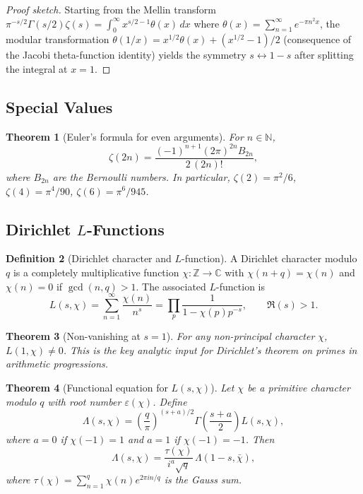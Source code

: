 \documentclass[12pt,a4paper]{amsart}
\newtheorem{theorem}{Theorem}[section]
\theoremstyle{definition}
\newtheorem{definition}[theorem]{Definition}
\begin{document}
\begin{proof}[Proof sketch]
Starting from the Mellin transform \(\pi^{-s/2}\Gamma(s/2)\zeta(s)
= \int_0^\infty x^{s/2-1}\theta(x)\,dx\) where
\(\theta(x) = \sum_{n=1}^\infty e^{-\pi n^2 x}\), the modular transformation
\(\theta(1/x) = x^{1/2}\theta(x) + (x^{1/2}-1)/2\) (consequence of the Jacobi
theta-function identity) yields the symmetry \(s \leftrightarrow 1-s\) after splitting
the integral at \(x = 1\).
\end{proof}

\subsection{Special Values}

\begin{theorem}[Euler's formula for even arguments]
For \(n \in \mathbb{N}\),
\[
  \zeta(2n) = \frac{(-1)^{n+1}(2\pi)^{2n}B_{2n}}{2\,(2n)!},
\]
where \(B_{2n}\) are the Bernoulli numbers.  In particular,
\(\zeta(2) = \pi^2/6\), \(\zeta(4) = \pi^4/90\), \(\zeta(6) = \pi^6/945\).
\end{theorem}

\subsection{Dirichlet \(L\)-Functions}

\begin{definition}[Dirichlet character and \(L\)-function]
A Dirichlet character modulo \(q\) is a completely multiplicative function
\(\chi: \mathbb{Z} \to \mathbb{C}\) with \(\chi(n+q) = \chi(n)\) and \(\chi(n) = 0\)
if \(\gcd(n,q) > 1\).  The associated \(L\)-function is
\[
  L(s,\chi) = \sum_{n=1}^\infty \frac{\chi(n)}{n^s}
  = \prod_p \frac{1}{1-\chi(p)p^{-s}}, \qquad \Re(s) > 1.
\]
\end{definition}

\begin{theorem}[Non-vanishing at \(s=1\)]
For any non-principal character \(\chi\), \(L(1,\chi) \neq 0\).  This is the key
analytic input for Dirichlet's theorem on primes in arithmetic progressions.
\end{theorem}

\begin{theorem}[Functional equation for \(L(s,\chi)\)]
Let \(\chi\) be a primitive character modulo \(q\) with root number \(\varepsilon(\chi)\).
Define
\[
  \Lambda(s,\chi) = \left(\frac{q}{\pi}\right)^{(s+a)/2}\!\Gamma\!\left(\frac{s+a}{2}\right)L(s,\chi),
\]
where \(a = 0\) if \(\chi(-1) = 1\) and \(a = 1\) if \(\chi(-1) = -1\).  Then
\[
  \Lambda(s,\chi) = \frac{\tau(\chi)}{i^a\sqrt{q}}\,\Lambda(1-s,\bar\chi),
\]
where \(\tau(\chi) = \sum_{n=1}^q \chi(n)e^{2\pi in/q}\) is the Gauss sum.
\end{theorem}
\end{document}
